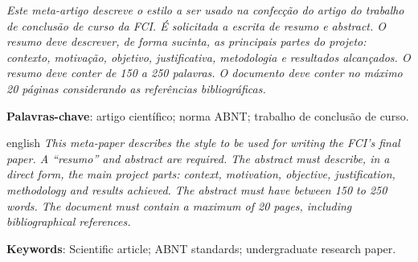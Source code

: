 \documentclass[
	article,			%
	11pt,				%
	oneside,			%
	a4paper,			%
	english,			%
	brazil,				%
	sumario=tradicional
	]{abntex2}
\begin{document}

\frenchspacing 


%
%

\maketitle



\begin{resumoumacoluna}
\textit{Este meta-artigo descreve o estilo a ser usado na confecção do artigo do trabalho de conclusão de curso da FCI. É solicitada a escrita de resumo e abstract. O resumo deve descrever, de forma sucinta, as principais partes do projeto: contexto, motivação, objetivo, justificativa, metodologia e resultados alcançados. O resumo deve conter de 150 a 250 palavras. O documento deve conter no máximo 20 páginas considerando as referências bibliográficas.}
 
 \vspace{\onelineskip}
 
 \noindent
 \textbf{Palavras-chave}: artigo científico; norma ABNT; trabalho de conclusão de curso.
\end{resumoumacoluna}


\renewcommand{\resumoname}{Abstract}
\begin{resumoumacoluna}
 \begin{otherlanguage*}{english}
\textit{This meta-paper describes the style to be used for writing the FCI’s final paper. A “resumo” and abstract are required. The abstract must describe, in a direct form, the main project parts: context, motivation, objective, justification, methodology and results achieved. The abstract must have between 150 to 250 words. The document must contain a maximum of 20 pages, including bibliographical references.}

   \vspace{\onelineskip}
 
   \noindent
   \textbf{Keywords}: Scientific article; ABNT standards; undergraduate research paper.
 \end{otherlanguage*}  
\end{resumoumacoluna}
\end{document}
